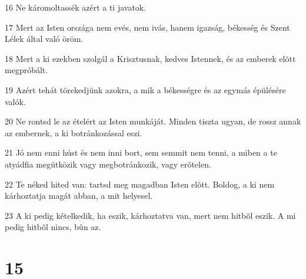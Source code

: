 \par 16 Ne káromoltassék azért a ti javatok.
\par 17 Mert az Isten országa nem evés, nem ivás, hanem igazság, békesség és Szent Lélek által való öröm.
\par 18 Mert a ki ezekben szolgál a Krisztusnak, kedves Istennek, és az emberek elõtt megpróbált.
\par 19 Azért tehát törekedjünk azokra, a mik a békességre és az egymás épülésére valók.
\par 20 Ne rontsd le az ételért az Isten munkáját. Minden tiszta ugyan, de rossz annak az embernek, a ki botránkozással eszi.
\par 21 Jó nem enni húst és nem inni bort, sem semmit nem tenni, a miben a te atyádfia megütközik vagy megbotránkozik, vagy erõtelen.
\par 22 Te néked hited van: tartsd meg magadban Isten elõtt. Boldog, a ki nem kárhoztatja magát abban, a mit helyesel.
\par 23 A ki pedig kételkedik, ha eszik, kárhoztatva van, mert nem hitbõl eszik. A mi pedig hitbõl nincs, bûn az.

\chapter{15}

